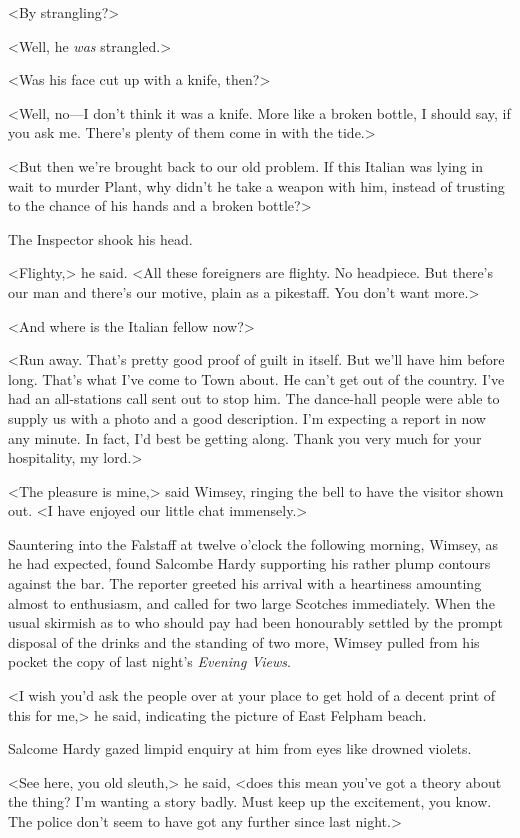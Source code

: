 <By strangling?>

<Well, he \textit{was} strangled.>

<Was his face cut up with a knife, then?>

<Well, no—I don't think it was a knife. More like a broken bottle, I should say, if you ask me. There's plenty of them come in with the tide.>

<But then we're brought back to our old problem. If this Italian was lying in wait to murder Plant, why didn't he take a weapon with him, instead of trusting to the chance of his hands and a broken bottle?>

The Inspector shook his head.

<Flighty,> he said. <All these foreigners are flighty. No headpiece. But there's our man and there's our motive, plain as a pikestaff. You don't want more.>

<And where is the Italian fellow now?>

<Run away. That's pretty good proof of guilt in itself. But we'll have him before long. That's what I've come to Town about. He can't get out of the country. I've had an all-stations call sent out to stop him. The dance-hall people were able to supply us with a photo and a good description. I'm expecting a report in now any minute. In fact, I'd best be getting along. Thank you very much for your hospitality, my lord.>

<The pleasure is mine,> said Wimsey, ringing the bell to have the visitor shown out. <I have enjoyed our little chat immensely.>

Sauntering into the Falstaff at twelve o'clock the following morning, Wimsey, as he had expected, found Salcombe Hardy supporting his rather plump contours against the bar. The reporter greeted his arrival with a heartiness amounting almost to enthusiasm, and called for two large Scotches immediately. When the usual skirmish as to who should pay had been honourably settled by the prompt disposal of the drinks and the standing of two more, Wimsey pulled from his pocket the copy of last night's \textit{Evening Views}.

<I wish you'd ask the people over at your place to get hold of a decent print of this for me,> he said, indicating the picture of East Felpham beach.

Salcome Hardy gazed limpid enquiry at him from eyes like drowned violets.

<See here, you old sleuth,> he said, <does this mean you've got a theory about the thing? I'm wanting a story badly. Must keep up the excitement, you know. The police don't seem to have got any further since last night.>


